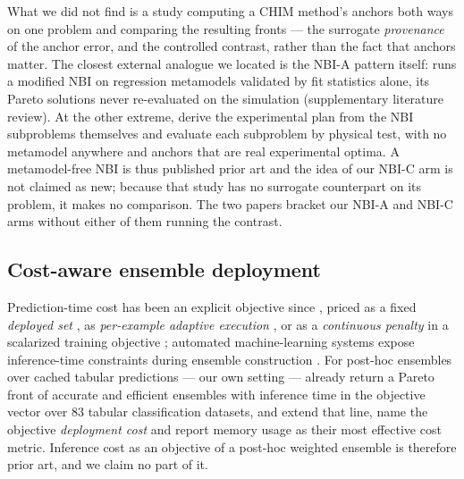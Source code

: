 What we did not find is a study computing a CHIM method's anchors both ways on one problem and comparing the
resulting fronts --- the surrogate \emph{provenance} of the anchor error, and the controlled contrast, rather than the
fact that anchors matter. The closest external analogue we located is the NBI-A pattern itself:
\citet{abolghasemian2022haulage} runs a modified NBI on regression metamodels validated by fit statistics alone,
its Pareto solutions never re-evaluated on the simulation (supplementary literature review). At the other
extreme, \citet{gellerich2023doenbi} derive the experimental plan from the NBI subproblems themselves and evaluate each
subproblem by physical test, with no metamodel anywhere and anchors that are real experimental optima. A metamodel-free
NBI is thus published prior art and the idea of our NBI-C arm is not claimed as new; because that study has no
surrogate counterpart on its problem, it makes no comparison. The two papers bracket our NBI-A and NBI-C arms without
either of them running the contrast.

\subsection{Cost-aware ensemble deployment}
\label{sec:rel:cost}

Prediction-time cost has been an explicit objective since \citet{turney2000types}, priced as a fixed \emph{deployed
set} \citep{zhou2002ensembling,ji2023pruning,maier2024hardware,maier2026hapens,gunasekaran2022cocktail,moreira2026energy},
as \emph{per-example adaptive execution}
\citep{xu2013cstc,trapeznikov2013multistage,nan2017adaptive,chen2020frugalml}, or as a \emph{continuous penalty} in a
scalarized training objective \citep{xu2012greedy,zhang2011sparse}; automated machine-learning systems expose
inference-time constraints during ensemble construction
\citep{erickson2020autogluon,feurer2022autosklearn,borchert2022paretoselect}. For post-hoc ensembles over cached
tabular predictions --- our own setting --- \citet{maier2024hardware} already return a Pareto front of accurate and
efficient ensembles with inference time in the objective vector over 83 tabular classification datasets, and
\citet{maier2026hapens} extend that line, name the objective \emph{deployment cost} and report memory usage as their
most effective cost metric. Inference cost as an objective of a post-hoc weighted ensemble is therefore prior art, and
we claim no part of it.

